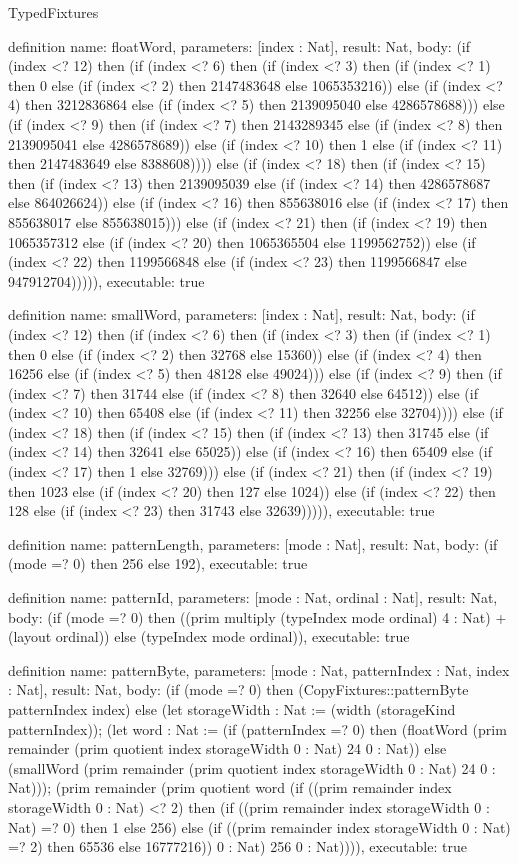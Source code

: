 \begin{lexlean}{TypedFixtures}
\begin{semanticmodule}
definition{
  name: floatWord,
  parameters: [index : Nat],
  result: Nat,
  body: (if (index <? 12) then (if (index <? 6) then (if (index <? 3) then (if (index <? 1) then 0 else (if (index <? 2) then 2147483648 else 1065353216)) else (if (index <? 4) then 3212836864 else (if (index <? 5) then 2139095040 else 4286578688))) else (if (index <? 9) then (if (index <? 7) then 2143289345 else (if (index <? 8) then 2139095041 else 4286578689)) else (if (index <? 10) then 1 else (if (index <? 11) then 2147483649 else 8388608)))) else (if (index <? 18) then (if (index <? 15) then (if (index <? 13) then 2139095039 else (if (index <? 14) then 4286578687 else 864026624)) else (if (index <? 16) then 855638016 else (if (index <? 17) then 855638017 else 855638015))) else (if (index <? 21) then (if (index <? 19) then 1065357312 else (if (index <? 20) then 1065365504 else 1199562752)) else (if (index <? 22) then 1199566848 else (if (index <? 23) then 1199566847 else 947912704))))),
  executable: true
}

definition{
  name: smallWord,
  parameters: [index : Nat],
  result: Nat,
  body: (if (index <? 12) then (if (index <? 6) then (if (index <? 3) then (if (index <? 1) then 0 else (if (index <? 2) then 32768 else 15360)) else (if (index <? 4) then 16256 else (if (index <? 5) then 48128 else 49024))) else (if (index <? 9) then (if (index <? 7) then 31744 else (if (index <? 8) then 32640 else 64512)) else (if (index <? 10) then 65408 else (if (index <? 11) then 32256 else 32704)))) else (if (index <? 18) then (if (index <? 15) then (if (index <? 13) then 31745 else (if (index <? 14) then 32641 else 65025)) else (if (index <? 16) then 65409 else (if (index <? 17) then 1 else 32769))) else (if (index <? 21) then (if (index <? 19) then 1023 else (if (index <? 20) then 127 else 1024)) else (if (index <? 22) then 128 else (if (index <? 23) then 31743 else 32639))))),
  executable: true
}

definition{
  name: patternLength,
  parameters: [mode : Nat],
  result: Nat,
  body: (if (mode =? 0) then 256 else 192),
  executable: true
}

definition{
  name: patternId,
  parameters: [mode : Nat, ordinal : Nat],
  result: Nat,
  body: (if (mode =? 0) then ((prim multiply (typeIndex mode ordinal) 4 : Nat) + (layout ordinal)) else (typeIndex mode ordinal)),
  executable: true
}

definition{
  name: patternByte,
  parameters: [mode : Nat, patternIndex : Nat, index : Nat],
  result: Nat,
  body: (if (mode =? 0) then (CopyFixtures::patternByte patternIndex index) else (let storageWidth : Nat := (width (storageKind patternIndex)); (let word : Nat := (if (patternIndex =? 0) then (floatWord (prim remainder (prim quotient index storageWidth 0 : Nat) 24 0 : Nat)) else (smallWord (prim remainder (prim quotient index storageWidth 0 : Nat) 24 0 : Nat))); (prim remainder (prim quotient word (if ((prim remainder index storageWidth 0 : Nat) <? 2) then (if ((prim remainder index storageWidth 0 : Nat) =? 0) then 1 else 256) else (if ((prim remainder index storageWidth 0 : Nat) =? 2) then 65536 else 16777216)) 0 : Nat) 256 0 : Nat)))),
  executable: true
}


\end{semanticmodule}
\end{lexlean}
